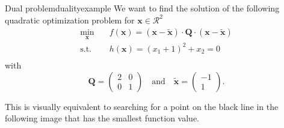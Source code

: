 \begin{example}{Dual problem}{dualityexample}
    We want to find the solution of the following quadratic optimization problem for $\mathbf{x} \in \mathcal{R}^2$
    \begin{equation}
        \begin{aligned}
            \min_{\mathbf{x}} \quad & f(\mathbf{x})= (\mathbf{x}-\tilde{\mathbf{x}}) \cdot \mathbf{Q} \cdot (\mathbf{x}-\tilde{\mathbf{x}})\\
            \textrm{s.t.} \quad     & h(\mathbf{x}) = (x_1+1)^2 + x_2 = 0  \\
        \end{aligned}
    \end{equation}
    with 
    \begin{equation}
        \mathbf{Q} = 
        \begin{pmatrix}
        2 & 0 \\
        0 & 1 
        \end{pmatrix} 
        \quad 
        \text{and}
        \quad
        \tilde{\mathbf{x}} = 
        \begin{pmatrix}
        -1\\
        1 
        \end{pmatrix}.
    \end{equation}

    This is visually equivalent to searching for a point on the black line in the following image that has the smallest function value.
    \begin{center}
        
    \end{center}


\end{example}
